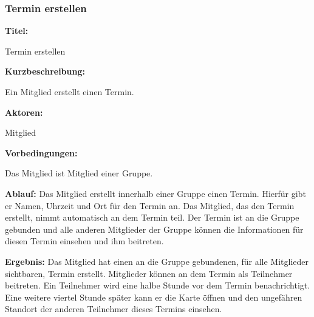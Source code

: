 \documentclass{scrartcl}
\begin{document}
	\subsubsection{Termin erstellen}
	\begin{description}
		\item \textbf{Titel:}
		\begin{description}
			\item Termin erstellen
		\end{description}
		\item \textbf{Kurzbeschreibung:}
		\begin{description}
			\item Ein Mitglied erstellt einen Termin.
		\end{description}
		\item \textbf{Aktoren:}
		\begin{description}
			\item \gls{Mitglied}
		\end{description}
		\item \textbf{Vorbedingungen:}
		\begin{description}
			\item Das Mitglied ist Mitglied einer Gruppe.
		\end{description}
		\item \textbf{Ablauf:} \newline Das Mitglied erstellt innerhalb einer Gruppe einen Termin. Hierfür gibt er Namen, Uhrzeit und Ort für den Termin an. Das Mitglied, das den Termin erstellt, nimmt automatisch an dem Termin teil. Der Termin ist an die Gruppe gebunden und alle anderen Mitglieder der Gruppe können die Informationen für diesen Termin einsehen und ihm beitreten.
		\item \textbf{Ergebnis:} \newline Das Mitglied hat einen an die Gruppe gebundenen, für alle Mitglieder sichtbaren, Termin erstellt. Mitglieder können an dem Termin als \gls{Teilnehmer} beitreten. Ein Teilnehmer wird eine halbe Stunde vor dem Termin benachrichtigt. Eine weitere viertel Stunde später kann er die Karte öffnen und den ungefähren Standort der anderen Teilnehmer dieses Termins einsehen.
	\end{description}
	
	\newpage
	
\end{document}
